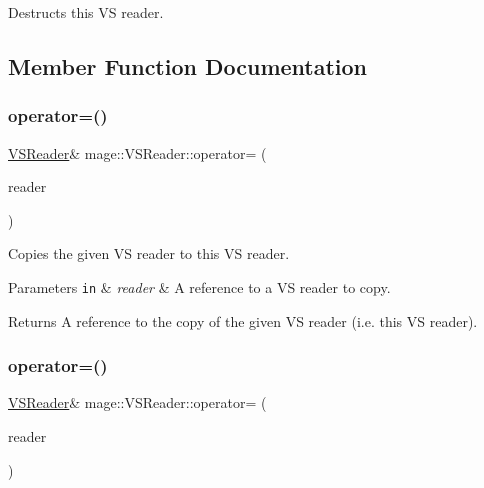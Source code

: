 Destructs this VS reader. 

\subsection{Member Function Documentation}
\hypertarget{classmage_1_1_v_s_reader_ab7d85956947e6b2a28650498573bc055}{}\label{classmage_1_1_v_s_reader_ab7d85956947e6b2a28650498573bc055} 
\subsubsection{\texorpdfstring{operator=()}{operator=()}\hspace{0.1cm}{\footnotesize\ttfamily [1/2]}}
{\footnotesize\ttfamily \hyperlink{classmage_1_1_v_s_reader}{V\+S\+Reader}\& mage\+::\+V\+S\+Reader\+::operator= (\begin{DoxyParamCaption}\item[{const \hyperlink{classmage_1_1_v_s_reader}{V\+S\+Reader} \&}]{reader }\end{DoxyParamCaption})\hspace{0.3cm}{\ttfamily [delete]}}

Copies the given VS reader to this VS reader.


\begin{DoxyParams}[1]{Parameters}
\mbox{\tt in}  & {\em reader} & A reference to a VS reader to copy. \\
\hline
\end{DoxyParams}
\begin{DoxyReturn}{Returns}
A reference to the copy of the given VS reader (i.\+e. this VS reader). 
\end{DoxyReturn}
\hypertarget{classmage_1_1_v_s_reader_a2be1e0645e3496f71c2f2b7fcf98ba2a}{}\label{classmage_1_1_v_s_reader_a2be1e0645e3496f71c2f2b7fcf98ba2a} 
\subsubsection{\texorpdfstring{operator=()}{operator=()}\hspace{0.1cm}{\footnotesize\ttfamily [2/2]}}
{\footnotesize\ttfamily \hyperlink{classmage_1_1_v_s_reader}{V\+S\+Reader}\& mage\+::\+V\+S\+Reader\+::operator= (\begin{DoxyParamCaption}\item[{\hyperlink{classmage_1_1_v_s_reader}{V\+S\+Reader} \&\&}]{reader }\end{DoxyParamCaption})\hspace{0.3cm}{\ttfamily [delete]}}

